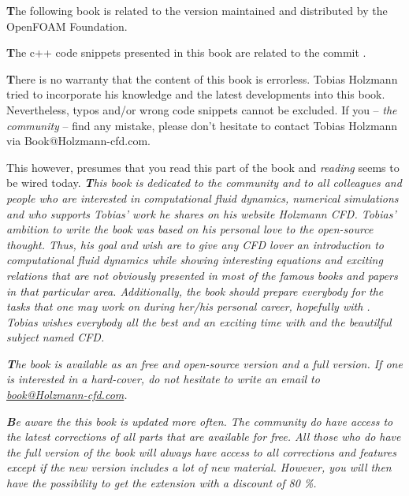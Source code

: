 \documentclass[LBMDerivation.tex]{subfiles}
\begin{document}


\newpage
%
%
    \textbf{T}he following book is related to the \OF version maintained and
    distributed by the OpenFOAM Foundation.

%
%
\vspace{20pt}
%
%
    \textbf{T}he c++ code snippets presented in this book are related to
    the \OF commit \DEV.

%
%
\vspace{20pt}
%
%
    \textbf{T}here is no warranty that the content of this book is errorless.
    Tobias Holzmann tried to incorporate his knowledge and the latest
    developments into this book. Nevertheless, typos and/or wrong code snippets
    cannot be excluded. If you -- \textit{the community} -- find any mistake,
    please don't hesitate to contact Tobias Holzmann via Book@Holzmann-cfd.com.

    This however, presumes that you read this part of the book and \textit{reading}
    seems to be wired today.
%
%
\newpage
%
%
%
\textit{
    \textbf{T}his book is dedicated to the \OF community and to all colleagues
    and people who are interested in computational fluid dynamics, numerical
    simulations and who supports Tobias' work he shares on his website Holzmann
    CFD. Tobias' ambition to write the book was based on his personal love to
    the open-source thought. Thus, his goal and wish are to give any CFD lover
    an introduction to computational fluid dynamics while showing interesting
    equations and exciting relations that are not obviously presented in most
    of the famous books and papers in that particular area. Additionally, the
    book should prepare everybody for the tasks that one may work on during
    her/his personal career, hopefully with \OF. Tobias wishes everybody all the
    best and an exciting time with \OF and the beautilful subject named CFD.
}

%
%
\vspace{20pt}
%
%
\textit{
    \textbf{T}he book is available as an free and open-source version and a full 
    version. If one is interested in a hard-cover, do not hesitate to write an email
    to \href{mailto:book@Holzmann-cfd.com}{\color{myCiteColor}book@Holzmann-cfd.com}.
}

%
%
\vspace{20pt}
%
%
\textit{
    \textbf{B}e aware the this book is updated more often. The \OF community do
    have access to the latest corrections of all parts that are available for free.
    All those who do have the full version of the book will always have access to
    all corrections and features except if the new version includes a lot of new
    material. However, you will then have the possibility to get the extension
    with a discount of 80 \%.
}
\end{document}
